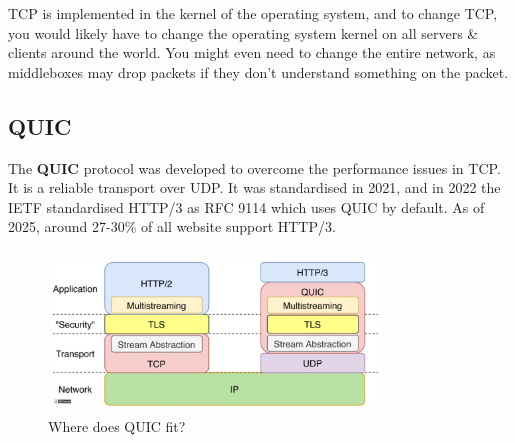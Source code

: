 \documentclass[a4paper,11pt]{article}
\begin{document}
TCP is implemented in the kernel of the operating system, and to change TCP, you would likely have to change the operating system kernel on all servers \& clients around the world.
You might even need to change the entire network, as middleboxes may drop packets if they don't understand something on the packet.

\subsection{QUIC}
The \textbf{QUIC} protocol was developed to overcome the performance issues in TCP.
It is a reliable transport over UDP.
It was standardised in 2021, and in 2022 the IETF standardised HTTP/3 as RFC 9114 which uses QUIC by default.
As of 2025, around 27-30\% of all website support HTTP/3.

\begin{figure}[H]
    \centering
    \includegraphics[width=0.8\textwidth]{./images/quicfit.png}
    \caption{Where does QUIC fit?}
\end{figure}
\end{document}
